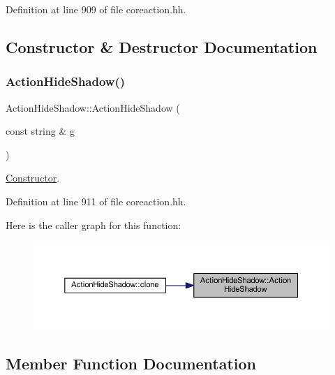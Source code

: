 Definition at line 909 of file coreaction.\+hh.



\subsection{Constructor \& Destructor Documentation}
\mbox{\label{class_action_hide_shadow_aaaee5d4c8b0ef3ef8556606312c680f4}} 
\subsubsection{\texorpdfstring{ActionHideShadow()}{ActionHideShadow()}}
{\footnotesize\ttfamily Action\+Hide\+Shadow\+::\+Action\+Hide\+Shadow (\begin{DoxyParamCaption}\item[{const string \&}]{g }\end{DoxyParamCaption})\hspace{0.3cm}{\ttfamily [inline]}}



\mbox{\hyperlink{class_constructor}{Constructor}}. 



Definition at line 911 of file coreaction.\+hh.

Here is the caller graph for this function\+:
\nopagebreak
\begin{figure}[H]
\begin{center}
\leavevmode
\includegraphics[width=350pt]{class_action_hide_shadow_aaaee5d4c8b0ef3ef8556606312c680f4_icgraph}
\end{center}
\end{figure}


\subsection{Member Function Documentation}
\mbox{\label{class_action_hide_shadow_a2f3d4cba003d9e55f07c2754280caf22}} 
